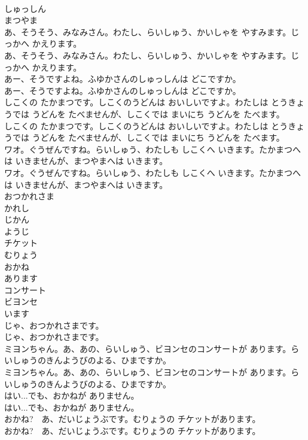 \documentclass[8pt]{extreport}
\begin{document}
\begin{CJK}{UTF8}{min}
\\	しゅっしん
\\	まつやま
\\	あ、そうそう、みなみさん。わたし、らいしゅう、かいしゃを やすみます。じっかへ かえります。	
\\	あ、そうそう、みなみさん。わたし、らいしゅう、かいしゃを やすみます。じっかへ かえります。 
\\	あー、そうですよね。ふゆかさんのしゅっしんは どこですか。	
\\	あー、そうですよね。ふゆかさんのしゅっしんは どこですか。 
\\	しこくの たかまつです。しこくのうどんは おいしいですよ。わたしは とうきょうでは うどんを たべませんが、しこくでは まいにち うどんを たべます。	
\\	しこくの たかまつです。しこくのうどんは おいしいですよ。わたしは とうきょうでは うどんを たべませんが、しこくでは まいにち うどんを たべます。 
\\	ワオ。ぐうぜんですね。らいしゅう、わたしも しこくへ いきます。たかまつへは いきませんが、まつやまへは いきます。	
\\	ワオ。ぐうぜんですね。らいしゅう、わたしも しこくへ いきます。たかまつへは いきませんが、まつやまへは いきます。 
\\	おつかれさま
\\	かれし
\\	じかん
\\	ようじ
\\	チケット
\\	むりょう
\\	おかね
\\	あります
\\	コンサート
\\	ビヨンセ
\\	います
\\	じゃ、おつかれさまです。	
\\	じゃ、おつかれさまです。 
\\	ミヨンちゃん。あ、あの、らいしゅう、ビヨンセのコンサートが あります。らいしゅうのきんようびのよる、ひまですか。	
\\	ミヨンちゃん。あ、あの、らいしゅう、ビヨンセのコンサートが あります。らいしゅうのきんようびのよる、ひまですか。 
\\	はい...でも、おかねが ありません。	
\\	はい...でも、おかねが ありません。 
\\	おかね?　あ、だいじょうぶです。むりょうの チケットがあります。	
\\	おかね?　あ、だいじょうぶです。むりょうの チケットがあります。 

\end{CJK}
\end{document}
